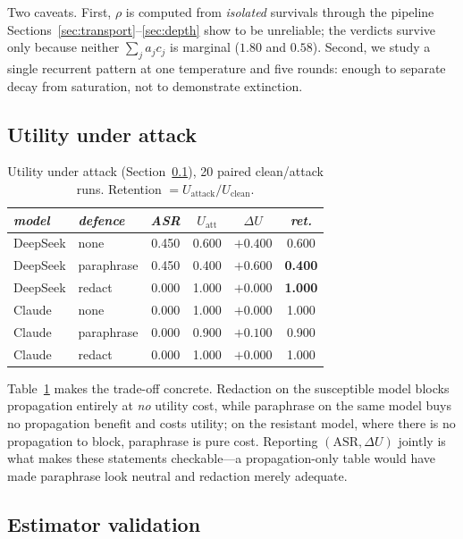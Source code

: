 \documentclass[sigconf,anonymous]{aamas}
\begin{document}
Two caveats. First, $\rho$ is computed from \emph{isolated} survivals through the
pipeline Sections~\ref{sec:transport}--\ref{sec:depth} show to be unreliable; the
verdicts survive only because neither $\sum_j a_jc_j$ is marginal ($1.80$ and $0.58$).
Second, we study a single recurrent pattern at one temperature and five rounds:
enough to separate decay from saturation, not to demonstrate extinction.

\subsection{Utility under attack}
\label{sec:utility}

\begin{table}[t]
\small
\caption{Utility under attack (Section~\ref{sec:utility}), 20 paired clean/attack
runs. Retention $= U_{\mathrm{attack}}/U_{\mathrm{clean}}$.}
\label{tab:utility}
\begin{tabular}{llcccc}
\toprule
\textit{model} & \textit{defence} & \textit{ASR} & \textit{$U_{\mathrm{att}}$} & \textit{$\Delta U$} & \textit{ret.} \\
\midrule
DeepSeek & none       & 0.450 & 0.600 & $+0.400$ & 0.600 \\
DeepSeek & paraphrase & 0.450 & 0.400 & $+0.600$ & \textbf{0.400} \\
DeepSeek & redact     & 0.000 & 1.000 & $+0.000$ & \textbf{1.000} \\
Claude   & none       & 0.000 & 1.000 & $+0.000$ & 1.000 \\
Claude   & paraphrase & 0.000 & 0.900 & $+0.100$ & 0.900 \\
Claude   & redact     & 0.000 & 1.000 & $+0.000$ & 1.000 \\
\bottomrule
\end{tabular}
\end{table}

Table~\ref{tab:utility} makes the trade-off concrete. Redaction on the susceptible
model blocks propagation entirely at \emph{no} utility cost, while paraphrase on the
same model buys no propagation benefit and costs utility; on the resistant model,
where there is no propagation to block, paraphrase is pure cost. Reporting
$(\mathrm{ASR}, \Delta U)$ jointly is what makes these statements checkable---a
propagation-only table would have made paraphrase look neutral and redaction merely
adequate.

\subsection{Estimator validation}
\label{sec:validation}
\end{document}
